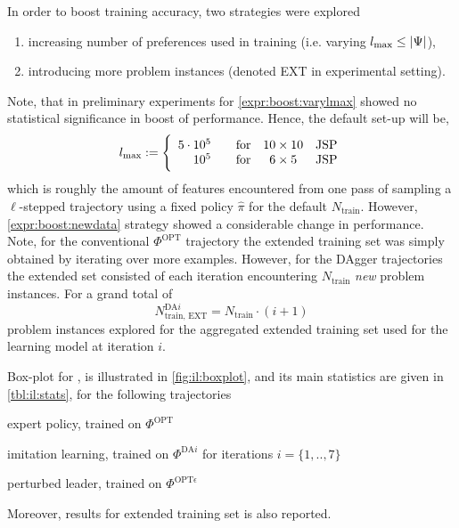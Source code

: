 \documentclass[smallextended]{svjour3}
\begin{document}
In order to boost training accuracy, two strategies were explored 
\begin{enumerate}[after={{}}, leftmargin=*,
  label={\textbf{Boost.\arabic*}}, ref={{Boost.\arabic*}}]
  \item \label{expr:boost:varylmax} increasing number of preferences used 
  in training (i.e. varying \mbox{$l_{\max} \leq \lvert\Psi\rvert$}),
  \item \label{expr:boost:newdata} introducing more problem instances (denoted 
  EXT in experimental setting).
\end{enumerate}
Note, that in preliminary experiments for \ref{expr:boost:varylmax} showed no 
statistical significance in boost of performance. Hence, the default set-up 
will be, 
\begin{equation}
l_{\max} := \Bigg \{ \begin{array}{rccc} 
5 \cdot 10^5 & \quad\text{for} & 10\times 10 & \text{JSP} \\
10^5 & \quad\text{for} & 6\times 5 & \text{JSP}
\end{array}
\end{equation}
which is roughly the amount of features encountered from one pass of sampling a 
\mbox{$\ell$-stepped} trajectory using a fixed policy $\hat{\pi}$ for the 
default $N_{\text{train}}$.
However, \ref{expr:boost:newdata} strategy showed a considerable change in 
performance. 
Note, for the conventional $\Phi^{\text{OPT}}$ trajectory the extended training 
set was simply obtained by iterating over more examples. 
However, for the DAgger trajectories the extended set consisted of each 
iteration encountering $N_{\text{train}}$ \emph{new} problem 
instances. For a grand total of 
\begin{equation}
N^{\text{DA}i}_{\text{train, EXT}}=N_{\text{train}}\cdot (i+1) 
\end{equation}
problem instances explored for the aggregated extended training set used for 
the learning model at iteration $i$.

Box-plot for  \namerho, is illustrated in \cref{fig:il:boxplot}, 
and its main statistics are given in \cref{tbl:il:stats}, for the following 
trajectories
\begin{enumerate*}
  \item expert policy, trained on $\Phi^{\text{OPT}}$
  \item imitation learning, trained on $\Phi^{\text{DA}i}$ for iterations 
  $i=\{1,..,7\}$
  \item perturbed leader, trained on $\Phi^{\text{OPT}\epsilon}$
\end{enumerate*}
Moreover, results for extended training set is also reported.
\end{document}
